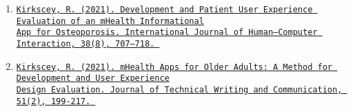 \begin{cvpubs}
    \begin{enumerate}
        \setlength\itemsep{-0.5em}
        \item     \href{https://pure.psu.edu/en/publications/development-and-patient-user-experience-evaluation-of-an-mhealth-}{{\texttt{Kirkscey, R. (2021). Development and Patient User Experience Evaluation of an mHealth Informational\\App for Osteoporosis. International Journal of Human–Computer Interaction, 38(8), 707–718. 
    }}}
    \item     \href{https://pure.psu.edu/en/publications/mhealth-apps-for-older-adults-a-method-for-development-and-user-e}{{\texttt{Kirkscey, R. (2021). mHealth Apps for Older Adults: A Method for Development and User Experience\\Design Evaluation. Journal of Technical Writing and Communication, 51(2), 199-217. 
    }}}
    \end{enumerate}
\end{cvpubs}

